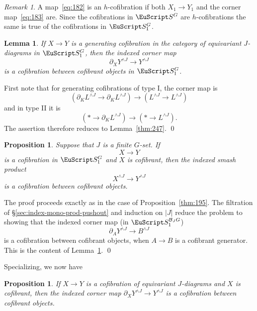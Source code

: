 \documentclass{amsart}
\newtheorem{lem}[equation]{Lemma}
\newtheorem{prop}[equation]{Proposition}
\newtheorem{rem}[equation]{Remark}
\theoremstyle{definition}
\theoremstyle{remark}
\newtheorem{rem}[equation]{Remark}
\newenvironment{pf}{\bigskip{\em Proof:\/}}{\qed\medskip}
\newcommand{\spectra}{\EuScript S}
\newcommand{\ugspectra}[1]{\spectra^{#1}}
\newcommand{\cat}[1]{{\mathcal #1}}
\newcommand{\augspectra}[1]{\spectra_{1}^{#1}}
\newcommand{\aspectra}[1]{\spectra_{1}^{#1}}
\begin{document}
\begin{rem}
\label{rem:55} 
A map~\eqref{eq:182} is an $h$-cofibration if both
$X_{1}\to Y_{1}$ and the corner map~\eqref{eq:183} are.  Since the
cofibrations in $\ugspectra{G}$ are $h$-cofibrations the same is true
of the cofibrations in $\augspectra{G}$.
\end{rem}


\begin{lem}
\label{thm:268} If $X\to Y$ is a generating cofibration in the
category of equivariant $J$-diagrams in $\augspectra{G}$, then the
indexed corner map
\[
\partial_{X}Y^{\wedge J}\to
Y^{\wedge J}
\]
is a cofibration between cofibrant objects in
$\augspectra{G}$.
\end{lem}

\begin{pf}
First note that for generating cofibrations of type I, the corner map is
\[
(\partial_{K}L^{\wedge J}\to \partial_{K}L^{\wedge J}) \to (L^{\wedge
J}\to L^{\wedge J})
\]
and in type II it is 
\[
(\ast \to \partial_{K}L^{\wedge J}) \to (\ast \to L^{\wedge J}).
\]
The assertion therefore reduces to Lemma~\ref{thm:247}.
\end{pf}

\begin{prop}
\label{thm:267} 
Suppose that $J$ is a finite $G$-set.
If
\[
X\to Y 
\]
is a cofibration in $\augspectra{G}$ and $X$ is cofibrant, then the
indexed smash product
\[
X^{\wedge J} \to Y^{\wedge J}
\]
is a cofibration between cofibrant objects.
\end{prop}

\begin{pf}
The proof proceeds exactly as in the case of
Proposition~\ref{thm:195}.  The filtration of
\S\ref{sec:index-mono-prod-pushout} and induction on $|J|$ reduce the
problem to showing that the indexed corner map (in $\aspectra{\cat{B}_{J}G}$)
\[
\partial_{ A}  Y^{\wedge J} \to
B^{\wedge J}
\]
is a cofibration between cofibrant objects, when $A\to B$ is a
cofibrant generator.  This is the content of Lemma~\ref{thm:268}.
\end{pf}

Specializing, we now have

\begin{prop}
\label{thm:266} If $X\to Y$ is a cofibration of equivariant
$J$-diagrams and $X$ is cofibrant, then the indexed corner map
$\partial_{X}Y^{\wedge J}\to Y^{\wedge J}$ is a cofibration between
cofibrant objects.
\end{prop}
\end{document}
